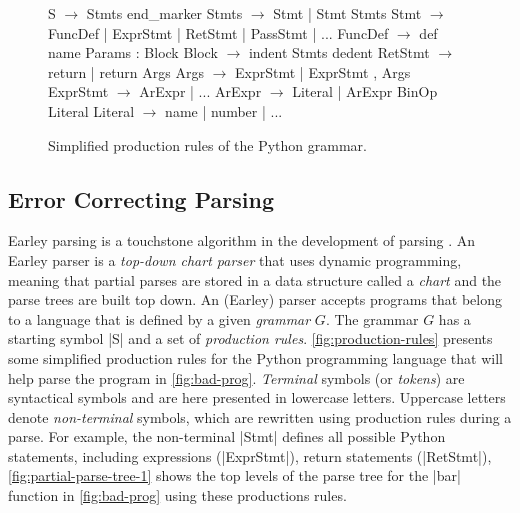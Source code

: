 \begin{figure}[t]
\begin{rules}
S        $\rightarrow$ Stmts end_marker
Stmts    $\rightarrow$ Stmt \n | Stmt \n Stmts
Stmt     $\rightarrow$ FuncDef | ExprStmt | RetStmt | PassStmt | ...
FuncDef  $\rightarrow$ def name Params : Block
Block    $\rightarrow$ \n indent Stmts dedent
RetStmt  $\rightarrow$ return | return Args
Args     $\rightarrow$ ExprStmt | ExprStmt , Args
ExprStmt $\rightarrow$ ArExpr | ...
ArExpr   $\rightarrow$ Literal | ArExpr BinOp Literal
Literal  $\rightarrow$ name | number | ...
\end{rules}
\caption{Simplified production rules of the Python grammar.}
\label{fig:production-rules}
\end{figure}

\subsection{Error Correcting Parsing}
\label{sec:overview:ec-parsing}

 Earley parsing is a touchstone
algorithm in the development of parsing \citep{Earley_1970}. An Earley parser is a
\emph{top-down chart parser} that uses dynamic programming, meaning that partial
parses are stored in a data structure called a \emph{chart} and the parse trees
are built top down. An (Earley) parser accepts programs that belong to a
language that is defined by a given \emph{grammar} $G$. The grammar $G$ has a
starting symbol |S| and a set of \emph{production rules}.
\autoref{fig:production-rules} presents some simplified production rules for the
Python programming language that will help parse the program in
\autoref{fig:bad-prog}. \emph{Terminal} symbols (or \emph{tokens}) are
syntactical symbols and are here presented in lowercase
letters. Uppercase letters denote \emph{non-terminal} symbols, which are
rewritten using production rules during a parse.
For example, the non-terminal |Stmt| defines all
possible Python statements, including expressions (|ExprStmt|), return statements
(|RetStmt|), \etc \autoref{fig:partial-parse-tree-1} shows the top levels of
the parse tree for the |bar| function in \autoref{fig:bad-prog} using these
productions rules.

